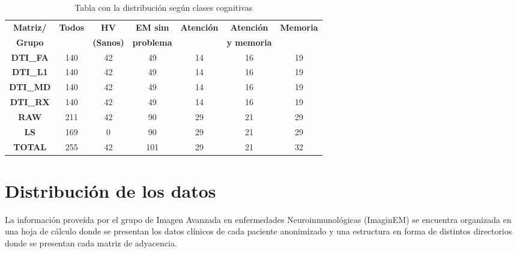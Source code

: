\begin{table}[]
\centering
\begin{tabular}{|c|c|c|c|c|c|c|}
\hline
\textbf{Matriz/} & \textbf{Todos} & \textbf{HV} & \textbf{EM sim} & \textbf{Atención} & \textbf{Atención} & \textbf{Memoria} \\
\textbf{Grupo} &  & \textbf{(Sanos)} & \textbf{problema} & \textbf{} & \textbf{y memoria} & \textbf{} \\ \hline
\textbf{DTI\_FA}      & 140            & 42                  & 49                       & 14                & 16                          & 19               \\ \hline
\textbf{DTI\_L1}      & 140            & 42                  & 49                       & 14                & 16                          & 19               \\ \hline
\textbf{DTI\_MD}      & 140            & 42                  & 49                       & 14                & 16                          & 19               \\ \hline
\textbf{DTI\_RX}      & 140            & 42                  & 49                       & 14                & 16                          & 19               \\ \hline
\textbf{RAW}          & 211            & 42                  & 90                       & 29                & 21                          & 29               \\ \hline
\textbf{LS}           & 169            & 0                   & 90                       & 29                & 21                          & 29               \\ \hline
\textbf{TOTAL}        & 255            & 42                  & 101                      & 29                & 21                          & 32               \\ \hline
\end{tabular}
\label{table:totales}
\caption{Tabla con la distribución según clases cognitivas}

\end{table}

\section{Distribución de los datos}

La información proveída por el grupo de Imagen Avanzada en enfermedades Neuroinmunológicas (ImaginEM) \cite{QueNeuroinmunologia} se encuentra organizada en una hoja de cálculo donde se presentan los datos clínicos de cada paciente anonimizado y una estructura en forma de distintos directorios donde se presentan cada matriz de adyacencia.


